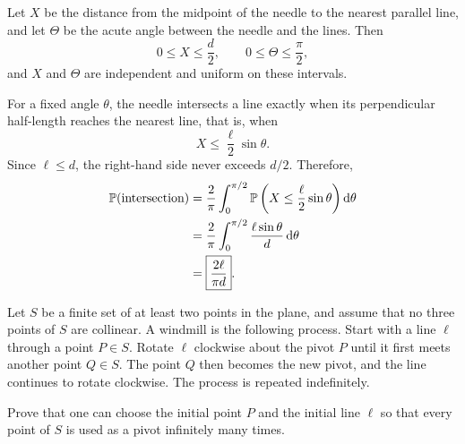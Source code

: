     \begin{solution}
        Let $X$ be the distance from the midpoint of the needle to the nearest
        parallel line, and let $\Theta$ be the acute angle between the needle
        and the lines. Then
        \[
            0\leq X\leq\frac{d}{2},
            \qquad
            0\leq\Theta\leq\frac{\pi}{2},
        \]
        and $X$ and $\Theta$ are independent and uniform on these intervals.

        For a fixed angle $\theta$, the needle intersects a line exactly when
        its perpendicular half-length reaches the nearest line, that is, when
        \[
            X\leq\frac{\ell}{2}\sin\theta.
        \]
        Since $\ell\leq d$, the right-hand side never exceeds $d/2$.
        Therefore,
        \[
            \begin{aligned}
                \mathbb{P}(\text{intersection})
                &=
                \frac{2}{\pi}
                \int_0^{\pi/2}
                \mathbb{P}\left(
                    X\leq\frac{\ell}{2}\sin\theta
                \right)\mathop{}\!\mathrm{d}\theta\\
                &=
                \frac{2}{\pi}
                \int_0^{\pi/2}
                \frac{\ell\sin\theta}{d}\mathop{}\!\mathrm{d}\theta\\
                &=
                \boxed{\frac{2\ell}{\pi d}}.
            \end{aligned}
        \]
    \end{solution}

    \begin{expectedproblem}
        Let $S$ be a finite set of at least two points in the plane, and assume
        that no three points of $S$ are collinear. A windmill is the following
        process. Start with a line $\ell$ through a point $P\in S$. Rotate
        $\ell$ clockwise about the pivot $P$ until it first meets another point
        $Q\in S$. The point $Q$ then becomes the new pivot, and the line
        continues to rotate clockwise. The process is repeated indefinitely.

        Prove that one can choose the initial point $P$ and the initial line
        $\ell$ so that every point of $S$ is used as a pivot infinitely many
        times.
    \end{expectedproblem}

